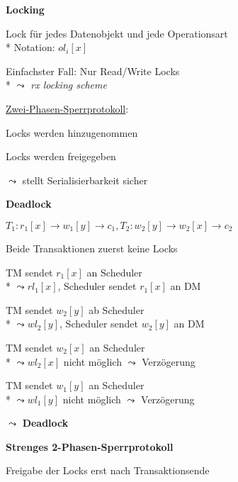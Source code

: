\textbf{Locking}
\begin{items}
	\item Lock für jedes Datenobjekt und jede Operationsart
		\\*
		Notation: \( ol_i[x] \)
	\item Einfachster Fall: Nur Read/Write Locks
		\\*
		\( \leadsto \) \emph{rx locking scheme}
	\item \underline{Zwei-Phasen-Sperrprotokoll}:
	\begin{enumeration}
		\item Locks werden hinzugenommen
		\item Locks werden freigegeben
	\end{enumeration}
	\( \leadsto \) stellt Serialisierbarkeit sicher
\end{items}

\textbf{Deadlock}
\begin{items}
	\item \( T_1: r_1[x] \to w_1[y] \to c_1, T_2: w_2[y] \to w_2[x] \to c_2 \)
	\begin{enumeration}
		\item Beide Transaktionen zuerst keine Locks
		\item TM sendet \( r_1[x] \) an Scheduler
			\\*
			\( \leadsto rl_1[x] \), Scheduler sendet \( r_1[x] \) an DM
		\item TM sendet \( w_2[y] \) ab Scheduler
			\\*
			\( \leadsto wl_2[y] \), Scheduler sendet \( w_2[y] \) an DM
		\item TM sendet \( w_2[x] \) an Scheduler
			\\*
			\( \leadsto wl_2[x] \) nicht möglich \( \leadsto \) Verzögerung
		\item TM sendet \( w_1[y] \) an Scheduler
			\\*
			\( \leadsto wl_1[y] \) nicht möglich \( \leadsto \) Verzögerung
	\end{enumeration}
	\( \leadsto \) \textbf{Deadlock}
\end{items}

\textbf{Strenges 2-Phasen-Sperrprotokoll}
\begin{items}
	\item Freigabe der Locks erst nach Transaktionsende
\end{items}

